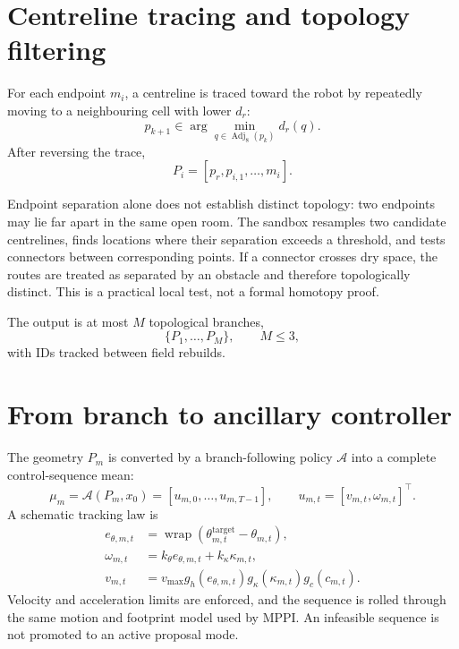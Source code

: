 \documentclass[11pt,a4paper]{article}
\newcommand{\Adj}{\operatorname{Adj}}
\begin{document}
\section{Centreline tracing and topology filtering}
\label{sec:centreline-topology}

For each endpoint $m_i$, a centreline is traced toward the robot by repeatedly
moving to a neighbouring cell with lower $d_r$:
\begin{equation}
  p_{k+1}\in
  \arg\min_{q\in\Adj_8(p_k)}d_r(q).
  \label{eq:backtrace}
\end{equation}
After reversing the trace,
\begin{equation}
  P_i=[p_r,p_{i,1},\ldots,m_i].
\end{equation}

Endpoint separation alone does not establish distinct topology: two endpoints
may lie far apart in the same open room. The sandbox resamples two candidate
centrelines, finds locations where their separation exceeds a threshold, and
tests connectors between corresponding points. If a connector crosses dry
space, the routes are treated as separated by an obstacle and therefore
topologically distinct. This is a practical local test, not a formal homotopy
proof.

The output is at most $M$ topological branches,
\begin{equation}
  \{P_1,\ldots,P_M\},\qquad M\leq3,
\end{equation}
with IDs tracked between field rebuilds.

\section{From branch to ancillary controller}

The geometry $P_m$ is converted by a branch-following policy $\mathcal A$ into
a complete control-sequence mean:
\begin{equation}
  \mu_m=\mathcal A(P_m,x_0)
  =[u_{m,0},\ldots,u_{m,T-1}],
  \qquad u_{m,t}=[v_{m,t},\omega_{m,t}]^\top.
  \label{eq:ancillary-mean}
\end{equation}
A schematic tracking law is
\begin{align}
  e_{\theta,m,t}
  &=\operatorname{wrap}
  (\theta^{\mathrm{target}}_{m,t}-\theta_{m,t}),\\
  \omega_{m,t}
  &=k_\theta e_{\theta,m,t}+k_\kappa\kappa_{m,t},\\
  v_{m,t}
  &=v_{\max}
  g_h(e_{\theta,m,t})g_\kappa(\kappa_{m,t})g_c(c_{m,t}).
\end{align}
Velocity and acceleration limits are enforced, and the sequence is rolled
through the same motion and footprint model used by MPPI. An infeasible
sequence is not promoted to an active proposal mode.
\end{document}
